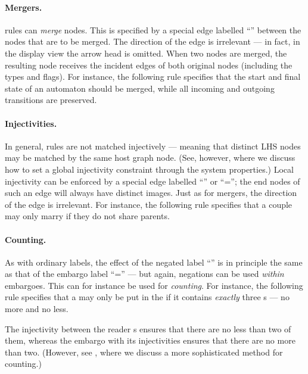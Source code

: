 \paragraph{Mergers.}

\GROOVE rules can \emph{merge} nodes. This is specified by a special edge
labelled ``\newP\lab{=}'' between the nodes that are to be merged. The
direction of the edge is irrelevant --- in fact, in the display view the arrow
head is omitted. When two nodes are merged, the resulting
node receives the incident edges of both original nodes (including the
types and flags). For instance, the following rule specifies that the start
and final state of an automaton should be merged, while all incoming and
outgoing transitions are preserved.


\paragraph{Injectivities.}

In general, rules are not matched injectively --- meaning that distinct LHS
nodes may be matched by the same host graph node. (See, however,
 where we discuss how to set a global injectivity
constraint through the system properties.) Local injectivity can be enforced by
a special edge labelled ``\lab{!=}'' or ``\notP\lab=''; the end nodes of
such an edge will always have distinct images. Just as for mergers, the
direction of the edge is irrelevant. For instance, the following rule specifies
that a couple may only marry if they do not share parents.


\paragraph{Counting.}

As with ordinary labels, the effect of the negated label ``\lab{!=}'' is in
principle the same as that of the embargo label ``\notP\lab='' --- but again,
negations can be used \emph{within} embargoes. This can for instance be used
for \emph{counting}. For instance, the following rule specifies that a
 may only be put in the  if it contains \emph{exactly}
three s --- no more and no less.

%
The injectivity between the reader s ensures that there are no less
than two of them, whereas the embargo  with its injectivities
ensures that there are no more than two. (However, see , where we
discuss a more sophisticated method for counting.)

